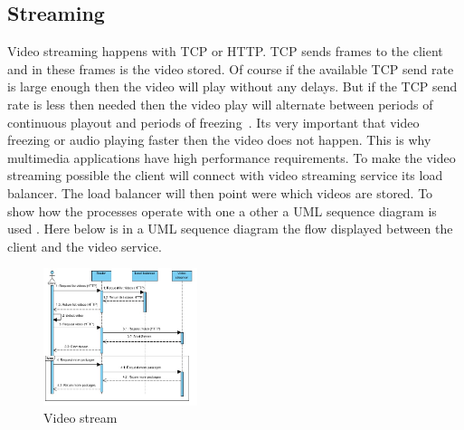 \documentclass{sig-alternate-br}
\begin{document}
\subsection{Streaming}\label{sec:stream}
Video streaming happens with TCP or HTTP. TCP sends frames to the client and in these frames is the video stored. Of course if the available TCP send rate is large enough then the video will play without any delays. But if the TCP send rate is less then needed then the video play will alternate between periods of continuous playout and periods of freezing~\cite{computer-networking}. Its very important that video freezing or audio playing faster then the video does not happen. This is why multimedia applications have high performance requirements. To make the video streaming possible the client will connect with video streaming service its load balancer. The load balancer will then point were which videos are stored. To show how the processes operate with one a other a UML sequence diagram is used \cite{Bernardi:2002:USD:584369.584376}. Here below is in a UML sequence diagram the flow displayed between the client and the video service. 
\begin{figure}[H]
	\centering 
	\includegraphics[width=0.4\textwidth]{VideoStreaming.jpg}
	\caption{Video stream}
	\label{fig:stream} %
\end{figure}
\end{document}

